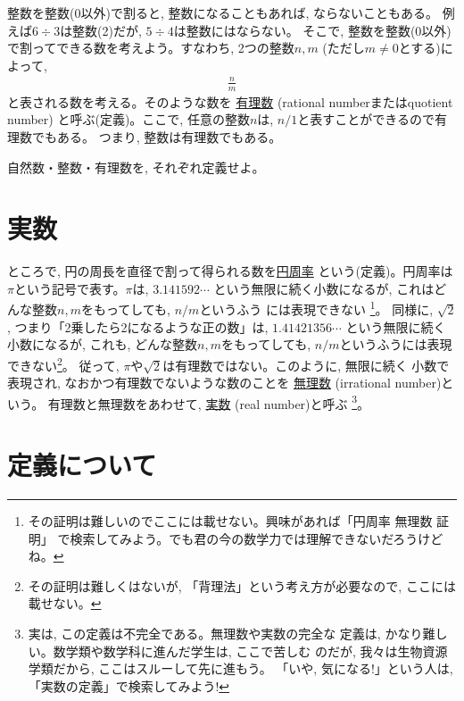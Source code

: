 整数を整数(0以外)で割ると, 整数になることもあれば, ならないこともある。
例えば$6\div 3$は整数(2)だが, $5\div4$は整数にはならない。
そこで, 整数を整数(0以外)で割ってできる数を考えよう。すなわち, 
2つの整数$n, m$ (ただし$m\ne0$とする)によって, 
\begin{eqnarray}
\frac{n}{m}
\end{eqnarray}
と表される数を考える。そのような数を
\underline{有理数} (rational numberまたはquotient number)
と呼ぶ(定義)。ここで, 任意の整数$n$は, $n/1$と表すことができるので有理数でもある。
つまり, 整数は有理数でもある。

\begin{q}\label{q:alg_num0}
 自然数・整数・有理数を, それぞれ定義せよ。
\end{q}
\mv

\section{実数}

ところで, 円の周長を直径で割って得られる数を\underline{円周率}
という(定義)。円周率は$\pi$という記号で表す。$\pi$は, $3.141592\cdots$
という無限に続く小数になるが, これはどんな整数$n, m$をもってしても, $n/m$というふう
には表現できない
\footnote{その証明は難しいのでここには載せない。興味があれば「円周率 無理数 証明」
で検索してみよう。でも君の今の数学力では理解できないだろうけどね。}。
同様に, $\sqrt{2}$, つまり「2乗したら2になるような正の数」は, $1.41421356\cdots$
という無限に続く小数になるが, これも, どんな整数$n, m$をもってしても, 
$n/m$というふうには表現できない\footnote{その証明は難しくはないが, 
「背理法」という考え方が必要なので, ここには載せない。}。
従って, $\pi$や$\sqrt{2}$は有理数ではない。このように, 無限に続く
小数で表現され, なおかつ有理数でないような数のことを
\underline{無理数} (irrational number)という。
有理数と無理数をあわせて, \underline{実数} (real number)と呼ぶ
\footnote{実は, この定義は不完全である。無理数や実数の完全な
定義は, かなり難しい。数学類や数学科に進んだ学生は, ここで苦しむ
のだが, 我々は生物資源学類だから, ここはスルーして先に進もう。
「いや, 気になる!」という人は, 「実数の定義」で検索してみよう!}。\\


\section{定義について}

